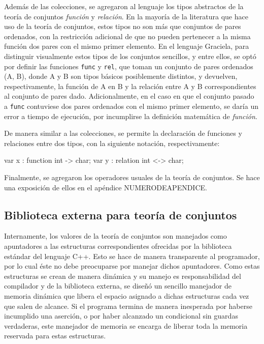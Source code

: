 Además de las colecciones, se agregaron al lenguaje los tipos abstractos de la
teoría de conjuntos \textit{función} y \textit{relación}. En la mayoría de la
literatura que hace uso de la teoría de conjuntos, estos tipos no son más que
conjuntos de pares ordenados, con la restricción adicional de que no pueden
pertenecer a la misma función dos pares con el mismo primer elemento. En el
lenguaje Graciela, para distinguir visualmente estos tipos de los
conjuntos sencillos, y entre ellos, se optó por definir las funciones
\texttt{func} y \texttt{rel}, que toman un conjunto de pares ordenados (A, B),
donde A y B son tipos básicos posiblemente distintos, y devuelven,
respectivamente, la función de A en B y la relación entre A y B correspondientes
al conjunto de pares dado. Adicionalmente, en el caso en que el conjunto pasado
a \texttt{func} contuviese dos pares ordenados con el mismo primer elemento, se
daría un error a tiempo de ejecución, por incumplirse la definición matemática
de \textit{función}.

De manera similar a las colecciones, se permite la declaración de funciones y
relaciones entre dos tipos, con la siguiente notación, respectivamente:

\begin{gracielacode}
  var x : function int -> char;
  var y : relation int <-> char;
\end{gracielacode}

Finalmente, se agregaron los operadores usuales de la teoría de conjuntos. Se
hace una exposición de ellos en el apéndice NUMERODEAPENDICE.

\subsection{Biblioteca externa para teoría de conjuntos}

Internamente, los valores de la teoría de conjuntos son manejados como
apuntadores a las estructuras correspondientes ofrecidas por la biblioteca
estándar del lenguaje C++. Esto se hace de manera transparente al programador,
por lo cual éste no debe preocuparse por manejar dichos apuntadores. Como  estas
estructuras se crean de manera dinámica y su manejo es responsabilidad del
compilador y de la biblioteca externa, se diseñó un sencillo manejador de
memoria dinámica que libera el espacio asignado a dichas estructuras cada vez
que salen de alcance. Si el programa termina de manera inesperada por haberse
incumplido una aserción, o por haber alcanzado un condicional sin guardas
verdaderas, este manejador de memoria se encarga de liberar toda la memoria
reservada para estas estructuras.

